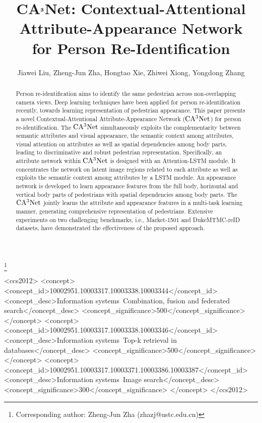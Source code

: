 \documentclass[sigconf]{acmart}
\begin{document}
\title{CA$\bf{^3}$Net: Contextual-Attentional Attribute-Appearance Network \\ for Person Re-Identification}


\author{Jiawei Liu, Zheng-Jun Zha, Hongtao Xie, Zhiwei Xiong, Yongdong Zhang}


\thanks{Corresponding author: Zheng-Jun Zha (zhazj@ustc.edu.cn)}

\renewcommand{\shortauthors}{Jiawei Liu et al.}


\begin{abstract}
Person re-identification aims to identify the same pedestrian across non-overlapping camera views. Deep learning techniques have been applied for person re-identification recently, towards learning representation of pedestrian appearance. This paper presents a novel Contextual-Attentional Attribute-Appearance Network ($\rm CA^3Net$) for person re-identification. The $\rm CA^3Net$ simultaneously exploits the complementarity between semantic attributes and visual appearance, the semantic context among attributes, visual attention on attributes as well as spatial dependencies among body parts, leading to discriminative and robust pedestrian representation. Specifically, an attribute network within $\rm CA^3Net$ is designed with an Attention-LSTM module. It concentrates the network on latent image regions related to each attribute as well as exploits the semantic context among attributes by a LSTM module. An appearance network is developed to learn appearance features from the full body, horizontal and vertical body parts of pedestrians with spatial dependencies among body parts. The $\rm CA^3Net$ jointly learns the attribute and appearance features in a multi-task learning manner, generating comprehensive representation of pedestrians. Extensive experiments on two challenging benchmarks, i.e., Market-1501 and DukeMTMC-reID datasets, have demonstrated the effectiveness of the proposed approach.
\end{abstract}

\begin{CCSXML}
	<ccs2012>
	<concept>
	<concept_id>10002951.10003317.10003338.10003344</concept_id>
	<concept_desc>Information systems~Combination, fusion and federated search</concept_desc>
	<concept_significance>500</concept_significance>
	</concept>
	<concept>
	<concept_id>10002951.10003317.10003338.10003346</concept_id>
	<concept_desc>Information systems~Top-k retrieval in databases</concept_desc>
	<concept_significance>500</concept_significance>
	</concept>
	<concept>
	<concept_id>10002951.10003317.10003371.10003386.10003387</concept_id>
	<concept_desc>Information systems~Image search</concept_desc>
	<concept_significance>300</concept_significance>
	</concept>
	</ccs2012>
\end{CCSXML}
\end{document}

